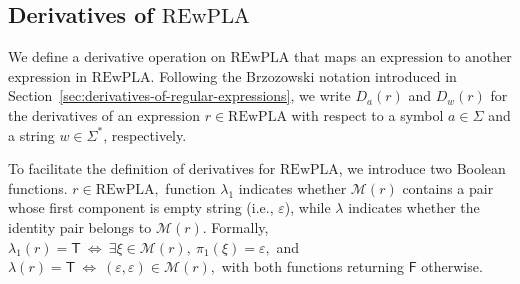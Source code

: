 \subsection{Derivatives of \textbf{$\mathrm{REwPLA}$}}
We define a derivative operation on $\mathrm{REwPLA}$ that maps an expression to another expression in $\mathrm{REwPLA}$. Following the Brzozowski notation introduced in Section~\ref{sec:derivatives-of-regular-expressions}, we write $D_a(r)$ and $D_w(r)$ for the derivatives of an expression $r\in\mathrm{REwPLA}$ with respect to a symbol $a\in\Sigma$ and a string $w\in\Sigma^*$, respectively. 

To facilitate the definition of derivatives for $\mathrm{REwPLA}$, we introduce two Boolean functions. $r \in \mathrm{REwPLA},$ function $\lambda_1$ indicates whether $\mathcal{M}(r)$ contains a pair whose first component is empty string (i.e., $\varepsilon$), while $\lambda$ indicates whether the identity pair belongs to $\mathcal{M}(r)$. Formally,
$
\lambda_1(r)=\mathsf{T}
\:\Longleftrightarrow\:
\exists \xi\in\mathcal{M}(r),\ \pi_1(\xi)=\varepsilon,
$
and
$
\lambda(r)=\mathsf{T}
\:\Longleftrightarrow\:
(\varepsilon,\varepsilon)\in\mathcal{M}(r),
$
with both functions returning $\mathsf{F}$ otherwise.

